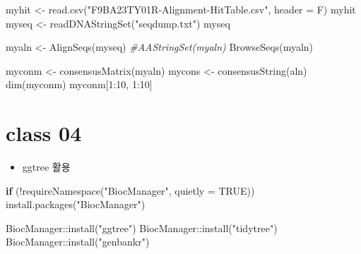 \documentclass[
]{book}
\newenvironment{Shaded}{\begin{snugshade}}{\end{snugshade}}
\newcommand{\AttributeTok}[1]{\textcolor[rgb]{0.77,0.63,0.00}{#1}}
\newcommand{\CommentTok}[1]{\textcolor[rgb]{0.56,0.35,0.01}{\textit{#1}}}
\newcommand{\ConstantTok}[1]{\textcolor[rgb]{0.00,0.00,0.00}{#1}}
\newcommand{\ControlFlowTok}[1]{\textcolor[rgb]{0.13,0.29,0.53}{\textbf{#1}}}
\newcommand{\DecValTok}[1]{\textcolor[rgb]{0.00,0.00,0.81}{#1}}
\newcommand{\FunctionTok}[1]{\textcolor[rgb]{0.00,0.00,0.00}{#1}}
\newcommand{\NormalTok}[1]{#1}
\newcommand{\OtherTok}[1]{\textcolor[rgb]{0.56,0.35,0.01}{#1}}
\newcommand{\SpecialCharTok}[1]{\textcolor[rgb]{0.00,0.00,0.00}{#1}}
\newcommand{\StringTok}[1]{\textcolor[rgb]{0.31,0.60,0.02}{#1}}
\providecommand{\tightlist}{%
  \setlength{\itemsep}{0pt}\setlength{\parskip}{0pt}}
\begin{document}
\begin{Shaded}
\begin{Highlighting}[]

\NormalTok{myhit }\OtherTok{\textless{}{-}} \FunctionTok{read.csv}\NormalTok{(}\StringTok{"F9BA23TY01R{-}Alignment{-}HitTable.csv"}\NormalTok{, }\AttributeTok{header =}\NormalTok{ F)}
\NormalTok{myhit}
\NormalTok{myseq }\OtherTok{\textless{}{-}} \FunctionTok{readDNAStringSet}\NormalTok{(}\StringTok{"seqdump.txt"}\NormalTok{)}
\NormalTok{myseq}

\NormalTok{myaln }\OtherTok{\textless{}{-}} \FunctionTok{AlignSeqs}\NormalTok{(myseq)}
\CommentTok{\#AAStringSet(myaln)}
\FunctionTok{BrowseSeqs}\NormalTok{(myaln)}

\NormalTok{myconm }\OtherTok{\textless{}{-}} \FunctionTok{consensusMatrix}\NormalTok{(myaln)}
\NormalTok{mycons }\OtherTok{\textless{}{-}} \FunctionTok{consensusString}\NormalTok{(aln)}
\FunctionTok{dim}\NormalTok{(myconm)}
\NormalTok{myconm[}\DecValTok{1}\SpecialCharTok{:}\DecValTok{10}\NormalTok{, }\DecValTok{1}\SpecialCharTok{:}\DecValTok{10}\NormalTok{]}
\end{Highlighting}
\end{Shaded}

\hypertarget{class-04-3}{%
\section{class 04}\label{class-04-3}}

\begin{itemize}
\tightlist
\item
  ggtree 활용
\end{itemize}

\begin{Shaded}
\begin{Highlighting}[]
\ControlFlowTok{if}\NormalTok{ (}\SpecialCharTok{!}\FunctionTok{requireNamespace}\NormalTok{(}\StringTok{"BiocManager"}\NormalTok{, }\AttributeTok{quietly =} \ConstantTok{TRUE}\NormalTok{))}
    \FunctionTok{install.packages}\NormalTok{(}\StringTok{"BiocManager"}\NormalTok{)}

\NormalTok{BiocManager}\SpecialCharTok{::}\FunctionTok{install}\NormalTok{(}\StringTok{"ggtree"}\NormalTok{)}
\NormalTok{BiocManager}\SpecialCharTok{::}\FunctionTok{install}\NormalTok{(}\StringTok{"tidytree"}\NormalTok{)}
\NormalTok{BiocManager}\SpecialCharTok{::}\FunctionTok{install}\NormalTok{(}\StringTok{"genbankr"}\NormalTok{)}
\end{Highlighting}
\end{Shaded}
\end{document}
